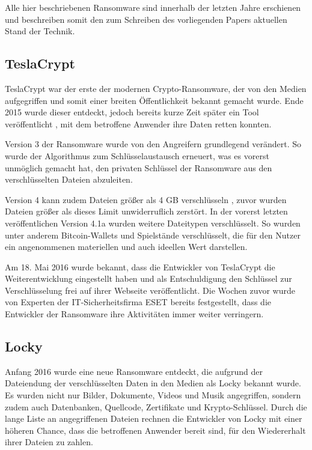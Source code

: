 Alle hier beschriebenen Ransomware sind innerhalb der letzten Jahre erschienen und beschreiben somit den zum Schreiben des vorliegenden Papers aktuellen Stand der Technik.

\subsection{TeslaCrypt}
TeslaCrypt war der erste der modernen Crypto-Ransomware, der von den Medien aufgegriffen und somit einer breiten Öffentlichkeit bekannt gemacht wurde. Ende 2015 \cite{tesla:entdeckt} wurde dieser entdeckt, jedoch bereits kurze Zeit später ein Tool veröffentlicht \cite{tesla:geknackt}, mit dem betroffene Anwender ihre Daten retten konnten.

Version 3 der Ransomware wurde von den Angreifern grundlegend verändert. So wurde der Algorithmus zum Schlüsselaustausch erneuert, was es vorerst unmöglich gemacht hat, den privaten Schlüssel der Ransomware aus den verschlüsselten Dateien abzuleiten. \cite{tesla:version3} \cite{tesla:version3_2}

Version 4 kann zudem Dateien größer als 4 GB verschlüsseln \cite{tesla:version4}, zuvor wurden Dateien größer als dieses Limit unwiderruflich zerstört. In der vorerst letzten veröffentlichen Version 4.1a \cite{tesla:version41} wurden weitere Dateitypen verschlüsselt. So wurden unter anderem Bitcoin-Wallets und Spielstände verschlüsselt, die für den Nutzer ein angenommenen materiellen und auch ideellen Wert darstellen.

Am 18. Mai 2016 wurde bekannt, dass die Entwickler von TeslaCrypt die Weiterentwicklung eingestellt haben und als Entschuldigung den Schlüssel zur Verschlüsselung frei auf ihrer Webseite veröffentlicht. Die Wochen zuvor wurde von Experten der IT-Sicherheitsfirma ESET bereits festgestellt, dass die Entwickler der Ransomware ihre Aktivitäten immer weiter verringern. \cite{tesla:end}

\subsection{Locky}
Anfang 2016 wurde eine neue Ransomware entdeckt, die aufgrund der Dateiendung der verschlüsselten Daten in den Medien als \glqq Locky\grqq{} bekannt wurde. Es wurden nicht nur Bilder, Dokumente, Videos und Musik angegriffen, sondern zudem auch Datenbanken, Quellcode, Zertifikate und Krypto-Schlüssel. Durch die lange Liste an angegriffenen Dateien rechnen die Entwickler von Locky mit einer höheren Chance, dass die betroffenen Anwender bereit sind, für den Wiedererhalt ihrer Dateien zu zahlen.

